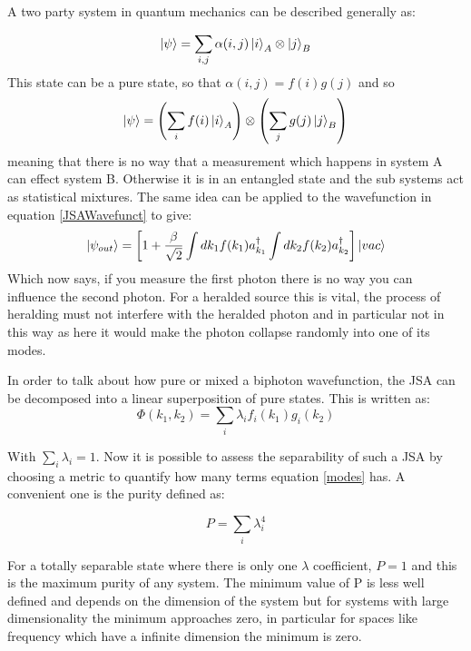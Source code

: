 A two party system in quantum mechanics can be described generally as:

\begin{equation}
\ket{\psi} = \sum_{i,j}\alpha(i,j)\ket{i}_A\otimes\ket{j}_B 
\end{equation}
\noindent
This state can be a pure state, so that $\alpha(i,j)=f(i)g(j)$ and so
\begin{equation}
\ket{\psi} = \left (\sum_{i}f(i)\ket{i}_A \right ) \otimes \left (\sum_{j}g(j)\ket{j}_B \right )
\end{equation}
meaning that there is no way that a measurement which happens in system A can effect system B. Otherwise it is in an entangled state and the sub systems act as statistical mixtures. The same idea can be applied to the wavefunction in equation \ref{JSAWavefunct} to give:
\begin{equation}
\ket{\psi_{out}}=\left [1 + \frac{\beta}{\sqrt{2}}\int dk_1f(k_1)a_{k_1}^{\dagger} \int dk_2f(k_2)a_{k_2}^{\dagger} \right ]\ket{vac}
\end{equation}
Which now says, if you measure the first photon there is no way you can influence the second photon. For a heralded source this is vital, the process of heralding must not interfere with the heralded photon and in particular not in this way as here it would make the photon collapse randomly into one of its modes.




In order to talk about how pure or mixed a biphoton wavefunction, the JSA can be decomposed into a linear superposition of pure states. This is written as\cite{harder_optimized_2013}:
\begin{equation} \label{modes}
	\Phi(k_1,k_2) = \sum_i \lambda_if_i(k_1)g_i(k_2)
\end{equation}

With $\sum_i \lambda_i=1$. Now it is possible to assess the separability of such a JSA by choosing a metric to quantify how many terms  equation \ref{modes} has. A convenient one is the purity defined as: 

\begin{equation} \label{purityEqn}
	P = \sum_i \lambda_i^4
\end{equation}

For a totally separable state where there is only one $\lambda$ coefficient, $P=1$ and this is the maximum purity of any system. The minimum value of P is less well defined and depends on the dimension of the system but for systems with large dimensionality the minimum approaches zero, in particular for spaces like frequency which have a infinite dimension the minimum is zero. 

